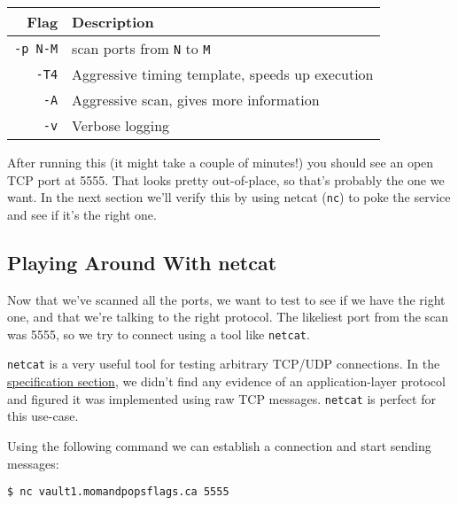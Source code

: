 \documentclass[11pt]{article}
\begin{document}
    \begin{table*}[h!]
        \centering
        \label{tab:nmap-command}
        \begin{tabular}{|r|l|}
            \hline
            \textbf{Flag} & \textbf{Description}                            \\ \hline
            \verb`-p N-M` & scan ports from \verb`N` to \verb`M`            \\ \hline
            \verb`-T4`    & Aggressive timing template, speeds up execution \\ \hline
            \verb`-A`     & Aggressive scan, gives more information         \\ \hline
            \verb`-v`     & Verbose logging                                 \\ \hline
        \end{tabular}
    \end{table*}

    After running this (it might take a couple of minutes!) you should see an open TCP port at 5555. That looks pretty out-of-place, so that's probably the one we want. In the next section we'll verify this by using netcat (\verb`nc`) to poke the service and see if it's the right one.

    \subsection{Playing Around With netcat}\label{subsec:playing-around-with-netcat}

    Now that we've scanned all the ports, we want to test to see if we have the right one, and that we're talking to the right protocol. The likeliest port from the scan was 5555, so we try to connect using a tool like \verb`netcat`.

    \verb`netcat` is a very useful tool for testing arbitrary TCP/UDP connections. In the \hyperref[subsec:specification]{specification section}, we didn't find any evidence of an application-layer protocol and figured it was implemented using raw TCP messages. \verb`netcat` is perfect for this use-case.

    \bigskip

    Using the following command we can establish a connection and start sending messages:

    \begin{lstlisting}[gobble=8,label={lst:netcat-command}]
        $ nc vault1.momandpopsflags.ca 5555
    \end{lstlisting}
\end{document}

